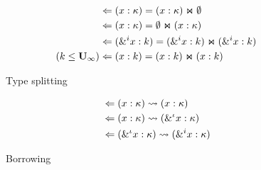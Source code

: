 \begin{figure*}[!h]
  \centering
  \begin{align*}
    \tsplit{&}{\bvar{x}{\kvar}}{\bvar{x}{\kvar}}{\Cempty}\\
    \tsplit{&}{\bvar{x}{\kvar}}{\Cempty}{\bvar{x}{\kvar}}\\
    \tsplit{&}{\bvar{\borrow[i]{x}}{k}}
              {\bvar{\borrow[i]{x}}{k}}{\bvar{\borrow[i]{x}}{k}}\\
    \tsplit{\Cleq{k}{\kun_\infty}&}{\bvar{x}{k}}{\bvar{x}{k}}{\bvar{x}{k}}
  \end{align*}
  \caption{Type splitting}
  \label{typesplit}
  \begin{align*}
    \tregion{&}{\bvar{x}{\kvar}}{\bvar{x}{\kvar}}\\
    \tregion{&}{\bvar{x}{\kvar}}{\bvar{\borrow{x}}{\kvar}}\\
    \tregion{&}{\bvar{\borrow{x}}{\kvar}}{\bvar{\borrow[i]{x}}{\kvar}}
  \end{align*}
  \caption{Borrowing}
  \label{typesplit}
\end{figure*}


